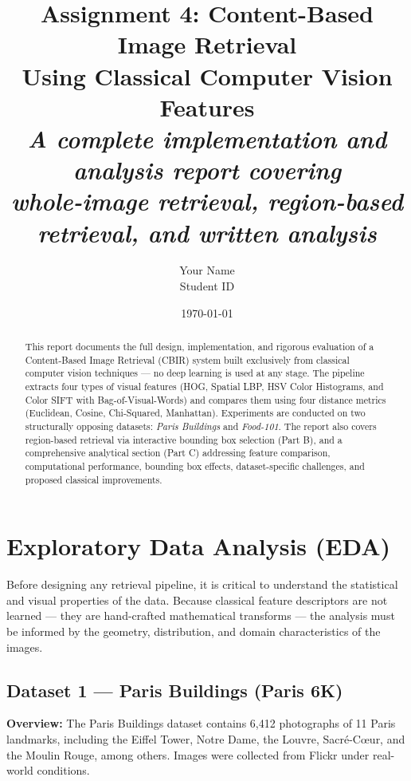 \documentclass[11pt, a4paper]{article}
\title{
  \vspace{1cm}
  \textbf{\LARGE Assignment 4: Content-Based Image Retrieval} \\[0.5em]
  \large Using Classical Computer Vision Features \\[1em]
  \normalsize \textit{A complete implementation and analysis report covering\\
  whole-image retrieval, region-based retrieval, and written analysis}
}
\author{Your Name \\ Student ID}
\date{\today}
\begin{document}
\maketitle
\thispagestyle{empty}

\begin{abstract}
This report documents the full design, implementation, and rigorous evaluation of a Content-Based Image Retrieval (CBIR) system built exclusively from classical computer vision techniques — no deep learning is used at any stage. The pipeline extracts four types of visual features (HOG, Spatial LBP, HSV Color Histograms, and Color SIFT with Bag-of-Visual-Words) and compares them using four distance metrics (Euclidean, Cosine, Chi-Squared, Manhattan). Experiments are conducted on two structurally opposing datasets: \textit{Paris Buildings} and \textit{Food-101}. The report also covers region-based retrieval via interactive bounding box selection (Part B), and a comprehensive analytical section (Part C) addressing feature comparison, computational performance, bounding box effects, dataset-specific challenges, and proposed classical improvements.
\end{abstract}

\newpage
\tableofcontents
\newpage

\section{Exploratory Data Analysis (EDA)}

Before designing any retrieval pipeline, it is critical to understand the statistical and visual properties of the data. Because classical feature descriptors are not learned — they are hand-crafted mathematical transforms — the analysis must be informed by the geometry, distribution, and domain characteristics of the images.

\subsection{Dataset 1 — Paris Buildings (Paris 6K)}

\textbf{Overview:} The Paris Buildings dataset contains 6,412 photographs of 11 Paris landmarks, including the Eiffel Tower, Notre Dame, the Louvre, Sacré-Cœur, and the Moulin Rouge, among others. Images were collected from Flickr under real-world conditions.
\end{document}

